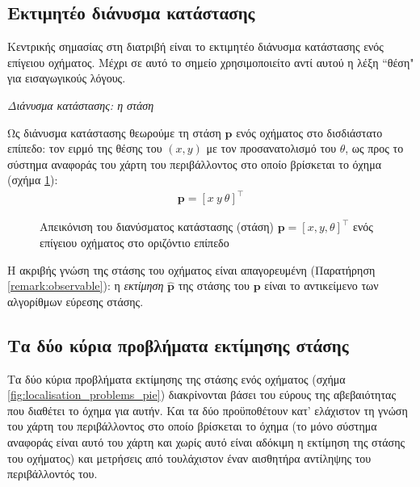 \subsection{Εκτιμητέο διάνυσμα κατάστασης}
\label{subsection:01_01_02:01}

Κεντρικής σημασίας στη διατριβή είναι το εκτιμητέο διάνυσμα κατάστασης ενός
επίγειου οχήματος. Μέχρι σε αυτό το σημείο χρησιμοποιείτο αντί αυτού η λέξη
``θέση" για εισαγωγικούς λόγους.

\begin{bw_box}
\begin{definition}
  \textit{Διάνυσμα κατάστασης: η στάση}

Ως διάνυσμα κατάστασης θεωρούμε τη στάση $\bm{p}$ ενός οχήματος στο δισδιάστατο
επίπεδο: τον ειρμό της θέσης του $(x,y)$ με τον προσανατολισμό του $\theta$,
ως προς το σύστημα αναφοράς του χάρτη του περιβάλλοντος στο οποίο βρίσκεται
το όχημα (σχήμα \ref{fig:pose_figure}):
  \begin{align}
    \bm{p} = [x \ y \ \theta]^\top
\end{align}

\end{definition}
\end{bw_box}

\begin{figure}[htbp]\centering
  
  \caption{\small Απεικόνιση του διανύσματος κατάστασης (στάση) $\bm{p} = [x,y,\theta]^\top$
           ενός επίγειου οχήματος στο οριζόντιο επίπεδο}
  \label{fig:pose_figure}
\end{figure}

Η ακριβής γνώση της στάσης του οχήματος είναι απαγορευμένη (Παρατήρηση
\ref{remark:observable}): η \textit{εκτίμηση} $\hat{\bm{p}}$ της στάσης του
$\bm{p}$ είναι το αντικείμενο των αλγορίθμων εύρεσης στάσης.



\subsection{Τα δύο κύρια προβλήματα εκτίμησης στάσης}
\label{subsec:01_01_02_2}

Τα δύο κύρια προβλήματα εκτίμησης της στάσης ενός οχήματος (σχήμα
\ref{fig:localisation_problems_pie}) διακρίνονται βάσει του εύρους της
αβεβαιότητας που διαθέτει το όχημα για αυτήν. Και τα δύο προϋποθέτουν
κατ' ελάχιστον τη γνώση του χάρτη του περιβάλλοντος στο οποίο
βρίσκεται το όχημα (το μόνο σύστημα αναφοράς είναι αυτό του χάρτη και χωρίς
αυτό είναι αδόκιμη η εκτίμηση της στάσης του οχήματος) και μετρήσεις από
τουλάχιστον έναν αισθητήρα αντίληψης του περιβάλλοντός του.


